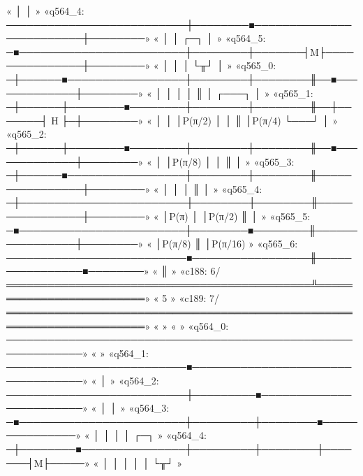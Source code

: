 «                                  │                                  │        »
«q564_4: ──────────────────────────┼────────■─────────────────────────┼────────»
«                                  │        │       ┌─┐               │        »
«q564_5: ─■────────────────────────┼────────┼───────┤M├───────────────┼────────»
«         │                        │        │       └╥┘               │        »
«q565_0: ─┼──────■─────────────────┼────────┼────────╫──■─────────────┼────────»
«         │      │                 │        │        ║  │       ┌───┐ │        »
«q565_1: ─┼──────┼────────■────────┼────────┼────────╫──┼───────┤ H ├─┼────────»
«         │      │        │P(π/2)  │        │        ║  │P(π/4) └───┘ │        »
«q565_2: ─┼──────┼────────■────────┼────────┼────────╫──■─────────────┼────────»
«         │      │P(π/8)           │        │        ║                │        »
«q565_3: ─┼──────■─────────────────┼────────┼────────╫────────────────┼────────»
«         │                        │        │        ║                │        »
«q565_4: ─┼────────────────────────┼────────┼────────╫────────────────┼────────»
«         │P(π)                    │        │P(π/2)  ║                │        »
«q565_5: ─■────────────────────────┼────────■────────╫────────────────┼────────»
«                                  │P(π/8)           ║                │P(π/16) »
«q565_6: ──────────────────────────■─────────────────╫────────────────■────────»
«                                                    ║                         »
«c188: 6/════════════════════════════════════════════╩═════════════════════════»
«                                                    5                         »
«c189: 7/══════════════════════════════════════════════════════════════════════»
«                                                                              »
«                                                                     »
«q564_0: ─────────────────────────────────────────────────────────────»
«                                                                     »
«q564_1: ──────────────────────────■──────────────────────────────────»
«                                  │                                  »
«q564_2: ──────────────────────────┼─────────■────────────────────────»
«                                  │         │                        »
«q564_3: ─■────────────────────────┼─────────┼────────■───────────────»
«         │                        │         │        │       ┌─┐     »
«q564_4: ─┼────────■───────────────┼─────────┼────────┼───────┤M├─────»
«         │        │               │         │        │       └╥┘     »
